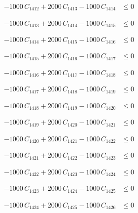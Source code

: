 \documentclass[a4paper,11pt]{article}
\begin{document}
\begin{align}
-1000\,C_{1412} + 2000\,C_{1413} - 1000\,C_{1414} &\leq 0 \nonumber
\end{align}

\begin{align}
-1000\,C_{1413} + 2000\,C_{1414} - 1000\,C_{1415} &\leq 0 \nonumber
\end{align}

\begin{align}
-1000\,C_{1414} + 2000\,C_{1415} - 1000\,C_{1416} &\leq 0 \nonumber
\end{align}

\begin{align}
-1000\,C_{1415} + 2000\,C_{1416} - 1000\,C_{1417} &\leq 0 \nonumber
\end{align}

\begin{align}
-1000\,C_{1416} + 2000\,C_{1417} - 1000\,C_{1418} &\leq 0 \nonumber
\end{align}

\begin{align}
-1000\,C_{1417} + 2000\,C_{1418} - 1000\,C_{1419} &\leq 0 \nonumber
\end{align}

\begin{align}
-1000\,C_{1418} + 2000\,C_{1419} - 1000\,C_{1420} &\leq 0 \nonumber
\end{align}

\begin{align}
-1000\,C_{1419} + 2000\,C_{1420} - 1000\,C_{1421} &\leq 0 \nonumber
\end{align}

\begin{align}
-1000\,C_{1420} + 2000\,C_{1421} - 1000\,C_{1422} &\leq 0 \nonumber
\end{align}

\begin{align}
-1000\,C_{1421} + 2000\,C_{1422} - 1000\,C_{1423} &\leq 0 \nonumber
\end{align}

\begin{align}
-1000\,C_{1422} + 2000\,C_{1423} - 1000\,C_{1424} &\leq 0 \nonumber
\end{align}

\begin{align}
-1000\,C_{1423} + 2000\,C_{1424} - 1000\,C_{1425} &\leq 0 \nonumber
\end{align}

\begin{align}
-1000\,C_{1424} + 2000\,C_{1425} - 1000\,C_{1426} &\leq 0 \nonumber
\end{align}
\end{document}
